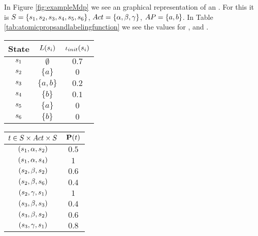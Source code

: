\documentclass[preview]{standalone}
\begin{document}
\begin{exmp}
In Figure \ref{fig:exampleMdp} we see an graphical representation of an \mdpN. For this \mdpN it is ${S} = \{{s}_1, {s}_2, {s}_3, {s}_4, {s}_5, {s}_6\}$, ${Act} = \{{\alpha}, {\beta}, {\gamma}\}$, ${AP} = \{a,b\}$. In Table \ref{tab:atomicpropsandlabelingfunction} we see the values for , \initdistrib and \trans.

\begin{table}[h!]
	\parbox{.45\linewidth}{
		\begin{center}
%			
			\begin{tabular}{c|c|c} %
				State & ${L}({s}_i)$ & ${\iota_{init}}({s}_i)$\\		
				\hline
				${s}_1$ & $\emptyset$ & $0.7$\\
				${s}_2$ & $\{a\}$ & $0$\\
				${s}_3$ & $\{a,b\}$ & $0.2$\\
				${s}_4$ & $\{b\}$ & $0.1$\\
				${s}_5$ & $\{a\}$ & $0$\\
				${s}_6$ & $\{b\}$ & $0$\\			
			\end{tabular}
		\end{center}
}
\parbox{.45\linewidth}{
		\begin{center}
			\begin{tabular}{c|c} %
				$t \in {S} \times {Act} \times {S}$ & ${{\textbf{P}}}(t)$\\		
				\hline
				$({s}_1,{\alpha}, {s}_2)$ & $0.5$\\
				$({s}_1,{\alpha}, {s}_4)$ & $1$\\
				$({s}_2,{\beta}, {s}_2)$ & $0.6$\\
				$({s}_2,{\beta}, {s}_6)$ & $0.4$\\
				$({s}_2,{\gamma}, {s}_1)$ & $1$\\
				$({s}_3,{\beta}, {s}_3)$ & $0.4$\\
				$({s}_3,{\beta}, {s}_2)$ & $0.6$\\
				$({s}_3,{\gamma}, {s}_1)$ & $0.8$\\

\end{tabular}
\end{center}}
\end{table}
\end{exmp}
\end{document}

